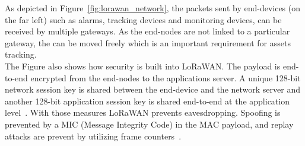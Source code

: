 As depicted in Figure~\ref{fig:lorawan_network}, the packets sent by end-devices (on the far left) such as alarms, tracking devices and monitoring devices,
can be received by multiple gateways. As the end-nodes are not linked to a particular gateway, the can be moved freely which is an important requirement for 
assets tracking.\\
The Figure also shows how security is built into LoRaWAN. The payload is end-to-end encrypted from the end-nodes to the applications server.
A unique 128-bit network session key is shared between  the end-device and the network server and 
another 128-bit application session key is shared end-to-end at the application level~\cite{about_lora_wan}.
With those measures LoRaWAN prevents eavesdropping. Spoofing is prevented by a MIC (Message Integrity Code)
in the MAC payload, and replay attacks are prevent by utilizing frame counters~\cite{lora_security}.

